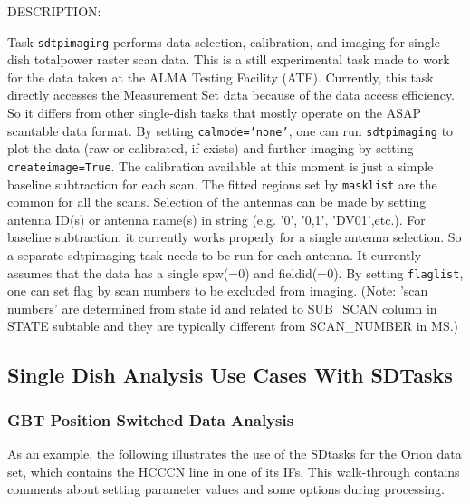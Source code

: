         DESCRIPTION:

        Task {\tt sdtpimaging} performs data selection, calibration, and imaging for single-dish
        totalpower raster scan data.  This is a still experimental task made to work for
        the data taken at the ALMA Testing Facility (ATF). Currently, this task directly
        accesses the Measurement Set data because of the data access efficiency.
        So it differs from other single-dish tasks that mostly operate on the ASAP scantable
        data format.  By setting {\tt calmode='none'}, one can run {\tt sdtpimaging} to plot the data
        (raw or calibrated, if exists) and further imaging by setting {\tt createimage=True}.
        The calibration available at this moment is just a simple baseline subtraction for
        each scan. The fitted regions set by {\tt masklist} are the common for all the scans.
        Selection of the antennas can be made by setting antenna ID(s) or antenna name(s)
        in string (e.g. '0', '0,1', 'DV01',etc.).
        For baseline subtraction, it currently works properly for a single antenna selection.
        So a separate sdtpimaging task needs to be run for each antenna.
        It currently assumes that the data has a single spw(=0) and fieldid(=0).
        By setting {\tt flaglist}, one can set flag by scan numbers to be excluded from imaging.
        (Note: 'scan numbers' are determined from state id and related to SUB\_SCAN column in STATE
         subtable and they are typically different from SCAN\_NUMBER in MS.)

\subsection{Single Dish Analysis Use Cases With SDTasks}
\label{section:sd.sdtasks.usecase}

\subsubsection{GBT Position Switched Data Analysis}
As an example, the following illustrates the use of the SDtasks for
the Orion data set, which contains the HCCCN line in one of its IFs.
This walk-through contains comments about setting parameter values
and some options during processing.

